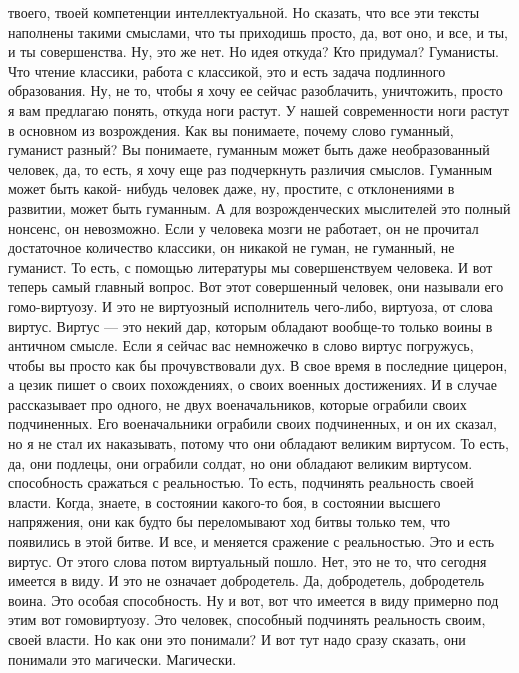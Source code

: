 твоего, твоей компетенции интеллектуальной. Но сказать, что все эти тексты
наполнены такими смыслами, что ты приходишь просто, да, вот оно, и все, и ты, и
ты совершенства. Ну, это же нет. Но идея откуда? Кто придумал? Гуманисты. Что
чтение классики, работа с классикой, это и есть задача подлинного образования.
Ну, не то, чтобы я хочу ее сейчас разоблачить, уничтожить, просто я вам
предлагаю понять, откуда ноги растут. У нашей современности ноги растут в
основном из возрождения. Как вы понимаете, почему слово гуманный, гуманист
разный? Вы понимаете, гуманным может быть даже необразованный человек, да, то
есть, я хочу еще раз подчеркнуть различия смыслов. Гуманным может быть какой-
нибудь человек даже, ну, простите, с отклонениями в развитии, может быть
гуманным. А для возрожденческих мыслителей это полный нонсенс, он невозможно.
Если у человека мозги не работает, он не прочитал достаточное количество
классики, он никакой не гуман, не гуманный, не гуманист. То есть, с помощью
литературы мы совершенствуем человека. И вот теперь самый главный вопрос. Вот
этот совершенный человек, они называли его гомо-виртуозу. И это не виртуозный
исполнитель чего-либо, виртуоза, от слова виртус. Виртус — это некий дар,
которым обладают вообще-то только воины в античном смысле. Если я сейчас вас
немножечко в слово виртус погружусь, чтобы вы просто как бы прочувствовали дух.
В свое время в последние цицерон, а цезик пишет о своих похождениях, о своих
военных достижениях. И в случае рассказывает про одного, не двух военачальников,
которые ограбили своих подчиненных. Его военачальники ограбили своих
подчиненных, и он их сказал, но я не стал их наказывать, потому что они обладают
великим виртусом. То есть, да, они подлецы, они ограбили солдат, но они обладают
великим виртусом. способность сражаться с реальностью. То есть, подчинять
реальность своей власти. Когда, знаете, в состоянии какого-то боя, в состоянии
высшего напряжения, они как будто бы переломывают ход битвы только тем, что
появились в этой битве. И все, и меняется сражение с реальностью. Это и есть
виртус. От этого слова потом виртуальный пошло. Нет, это не то, что сегодня
имеется в виду. И это не означает добродетель. Да, добродетель, добродетель
воина. Это особая способность. Ну и вот, вот что имеется в виду примерно под
этим вот гомовиртуозу. Это человек, способный подчинять реальность своим, своей
власти. Но как они это понимали? И вот тут надо сразу сказать, они понимали это
магически. Магически. 


